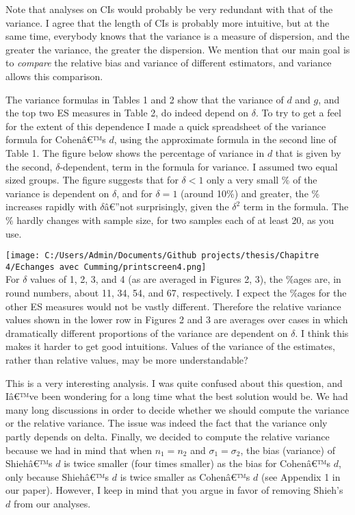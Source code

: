\begin{appendix}
Note that analyses on CIs would probably be very redundant with that of
the variance. I agree that the length of CIs is probably more intuitive,
but at the same time, everybody knows that the variance is a measure of
dispersion, and the greater the variance, the greater the dispersion. We
mention that our main goal is to \emph{compare} the relative bias and
variance of different estimators, and variance allows this comparison.

\color{black} The variance formulas in Tables 1 and 2 show that the
variance of \(d\) and \(g\), and the top two ES measures in Table 2, do
indeed depend on \(\delta\). To try to get a feel for the extent of this
dependence I made a quick spreadsheet of the variance formula for
Cohenâ€™s \(d\), using the approximate formula in the second line of
Table 1. The figure below shows the percentage of variance in \(d\) that
is given by the second, \(\delta\)-dependent, term in the formula for
variance. I assumed two equal sized groups. The figure suggests that for
\(\delta<1\) only a very small \(\%\) of the variance is dependent on
\(\delta\), and for \(\delta=1\) (around 10\(\%\)) and greater, the
\(\%\) increases rapidly with \(\delta\)â€''not surprisingly, given the
\(\delta^2\) term in the formula. The \(\%\) hardly changes with sample
size, for two samples each of at least 20, as you use.

\texttt{[image: C:/Users/Admin/Documents/Github projects/thesis/Chapitre 4/Echanges avec Cumming/printscreen4.png]}\\
For \(\delta\) values of 1, 2, 3, and 4 (as are averaged in Figures 2,
3), the \(\%\)ages are, in round numbers, about 11, 34, 54, and 67,
respectively. I expect the \(\%\)ages for the other ES measures would
not be vastly different. Therefore the relative variance values shown in
the lower row in Figures 2 and 3 are averages over cases in which
dramatically different proportions of the variance are dependent on
\(\delta\). I think this makes it harder to get good intuitions. Values
of the variance of the estimates, rather than relative values, may be
more understandable?

\color{blue} This is a very interesting analysis. I was quite confused
about this question, and Iâ€™ve been wondering for a long time what the
best solution would be. We had many long discussions in order to decide
whether we should compute the variance or the relative variance. The
issue was indeed the fact that the variance only partly depends on
delta. Finally, we decided to compute the relative variance because we
had in mind that when \(n_1=n_2\) and \(\sigma_1=\sigma_2\), the bias
(variance) of Shiehâ€™s \(d\) is twice smaller (four times smaller) as
the bias for Cohenâ€™s \(d\), only because Shiehâ€™s \(d\) is twice
smaller as Cohenâ€™s \(d\) (see Appendix 1 in our paper). However, I
keep in mind that you argue in favor of removing Shieh's \(d\) from our
analyses.


\end{appendix}
